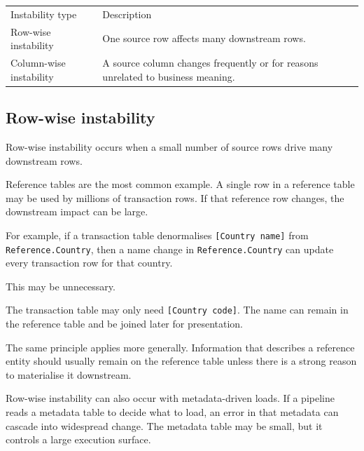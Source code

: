 \documentclass[10pt,openany,10pt]{book}
\newcounter{none}
\let\podeToprule\toprule
\let\podeMidrule\midrule
\let\podeBottomrule\bottomrule
\renewcommand{\toprule}{\arrayrulecolor{pbiGrid}\podeToprule}
\renewcommand{\midrule}{\arrayrulecolor{pbiGrid}\podeMidrule}
\renewcommand{\bottomrule}{\arrayrulecolor{pbiGrid}\podeBottomrule}
\begin{document}
{\def\LTcaptype{none} %
\begin{longtable}[]{@{}
  >{\raggedright\arraybackslash}p{}
  >{\raggedright\arraybackslash}p{}@{}}
\toprule\noalign{}
\begin{minipage}[b]{\linewidth}\raggedright
Instability type
\end{minipage} & \begin{minipage}[b]{\linewidth}\raggedright
Description
\end{minipage} \\
\midrule\noalign{}
\endhead
\bottomrule\noalign{}
\endlastfoot
Row-wise instability & One source row affects many downstream rows. \\
Column-wise instability & A source column changes frequently or for
reasons unrelated to business meaning. \\
\end{longtable}
}

\subsection{Row-wise instability}\label{row-wise-instability}

Row-wise instability occurs when a small number of source rows drive
many downstream rows.

Reference tables are the most common example. A single row in a
reference table may be used by millions of transaction rows. If that
reference row changes, the downstream impact can be large.

For example, if a transaction table denormalises
\texttt{{[}Country\ name{]}} from \texttt{Reference.Country}, then a
name change in \texttt{Reference.Country} can update every transaction
row for that country.

This may be unnecessary.

The transaction table may only need \texttt{{[}Country\ code{]}}. The
name can remain in the reference table and be joined later for
presentation.

The same principle applies more generally. Information that describes a
reference entity should usually remain on the reference table unless
there is a strong reason to materialise it downstream.

Row-wise instability can also occur with metadata-driven loads. If a
pipeline reads a metadata table to decide what to load, an error in that
metadata can cascade into widespread change. The metadata table may be
small, but it controls a large execution surface.
\end{document}
